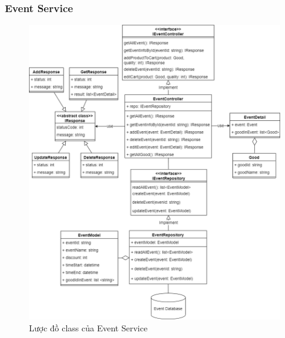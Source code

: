 \subsubsection{Event Service}
\begin{figure}[!htp]
	\centering
	\includegraphics[width=11cm]{img/Architecture/service/EventService.png}
	\newline
	\caption{Lược đồ class của Event Service}
\end{figure}


